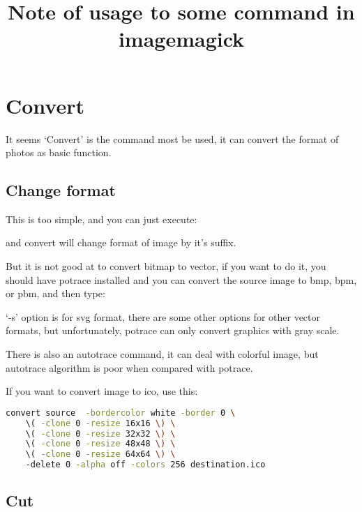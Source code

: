 \documentclass[12pt]{article}
\begin{document}
\title{Note of usage to some command in imagemagick}
\author{}
\maketitle
\tableofcontents
\section{Convert}
It seems `Convert' is the command most be used, it can convert the format of photos as basic function.
\subsection{Change format}
This is too simple, and you can just execute:\vspace{5mm}

{\centering{}\par}\vspace{5mm}

and convert will change format of image by it's suffix.

But it is not good at to convert bitmap to vector, if you want to do it, you should have potrace installed and you can convert the source image to bmp, bpm, or pbm, and then type:\vspace{5mm}

{\centering{}\par}\vspace{5mm}

`-s' option is for svg format, there are some other options for other vector formats, but unfortunately, potrace can only convert graphics with gray scale.

There is also an autotrace command, it can deal with colorful image, but autotrace algorithm is poor when compared with potrace.

If you want to convert image to ico, use this:\vspace{5mm}
\begin{lstlisting}[language=sh, frame=single]
convert source  -bordercolor white -border 0 \ 
	\( -clone 0 -resize 16x16 \) \ 
	\( -clone 0 -resize 32x32 \) \ 
	\( -clone 0 -resize 48x48 \) \ 
	\( -clone 0 -resize 64x64 \) \ 
	-delete 0 -alpha off -colors 256 destination.ico 
\end{lstlisting} \vspace{5mm}
\subsection{Cut}
{\centering{}\par}\vspace{5mm}
\end{document}
